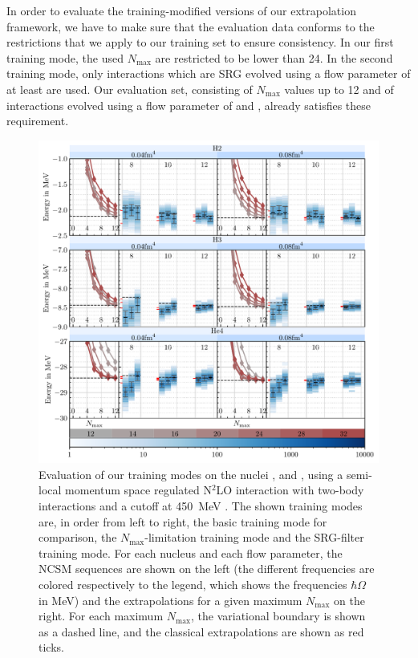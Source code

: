 In order to evaluate the training-modified versions of our extrapolation framework, we have to make sure that the evaluation data conforms to the restrictions that we apply to our training set to ensure consistency. In our first training mode, the used $N_\mathrm{max}$ are restricted to be lower than 24. In the second training mode, only interactions which are SRG evolved using a flow parameter of at least  are used. Our evaluation set, consisting of $N_\mathrm{max}$ values up to 12 and of interactions evolved using a flow parameter of  and , already satisfies these requirement.
\begin{figure}[H]
  \includegraphics[width=\textwidth]{media/extended_evaluation_ohne_fehlfit.pdf}
  \caption{Evaluation of our training modes on the nuclei ,  and , using a semi-local momentum space regulated N$^2$LO interaction with two-body interactions and a cutoff at \SI{450}{\mega\electronvolt} \cite{smsquelle}. The shown training modes are, in order from left to right, the basic training mode for comparison, the $N_\mathrm{max}$-limitation training mode and the SRG-filter training mode. For each nucleus and each flow parameter, the NCSM sequences are shown on the left (the different frequencies are colored respectively to the legend, which shows the frequencies $\hbar\Omega$ in \si[]{\mega\electronvolt}) and the extrapolations for a given maximum $N_\mathrm{max}$ on the right. For each maximum $N_\mathrm{max}$, the variational boundary is shown as a dashed line, and the classical extrapolations are shown as red ticks.}
  \label{fig:eval_extended}
\end{figure}

